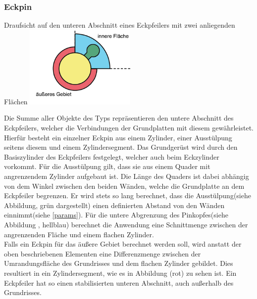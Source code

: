\subsubsection{Eckpin}
\label{Eckpin}
\begin{Bild}{Draufsicht auf den unteren Abschnitt eines Eckpfeilers mit zwei anliegenden Flächen}
	\includegraphics[height=150px]{Bilder/CornerPin2D-07.png}
\end{Bild}
Die Summe aller Objekte des Typs  repräsentieren den untere Abschnitt des Eckpfeilers, welcher die Verbindungen der Grundplatten mit diesem gewährleistet.
Hierfür besteht ein einzelner Eckpin aus einem Zylinder, einer Ausstülpung seitens diesem und einem Zylindersegment.
Das Grundgerüst wird durch den Basiszylinder des Eckpfeilers festgelegt, welcher auch beim Eckzylinder vorkommt.
Für die Ausstülpung gilt, dass sie aus einem Quader mit angrenzendem Zylinder aufgebaut ist.
Die Länge des Quaders ist dabei abhängig von dem Winkel zwischen den beiden Wänden, welche die Grundplatte an dem Eckpfeiler begrenzen.
Er wird stets so lang berechnet, dass die Ausstülpung(siehe Abbildung, grün dargestellt) einen definierten Abstand von den Wänden einnimmt(siehe \ref{params}).
Für die untere Abgrenzung des Pinkopfes(siehe Abbildung \thebildnr, hellblau) berechnet die Anwendung eine Schnittmenge zwischen der angrenzenden Fläche und einem flachen Zylinder.\\
Falls ein Eckpin für das äußere Gebiet berechnet werden soll, wird anstatt der oben beschriebenen Elementen eine Differenzmenge zwischen der Umrandungsfläche des Grundrisses und dem flachen Zylinder gebildet.
Dies resultiert in ein Zylindersegment, wie es in Abbildung \thebildnr (rot) zu sehen ist.
Ein Eckpfeiler hat so einen stabilisierten unteren Abschnitt, auch außerhalb des Grundrisses.


